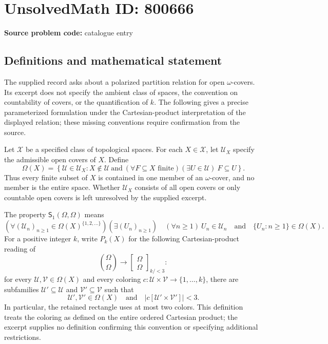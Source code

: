 \documentclass[11pt]{article}
\begin{document}
\section*{UnsolvedMath ID: 800666}
\textbf{Source problem code:} catalogue entry
\subsection{Definitions and mathematical statement}
The supplied record asks about a polarized partition relation for open \(\omega\)-covers. Its excerpt does not specify the ambient class of spaces, the convention on countability of covers, or the quantification of \(k\). The following gives a precise parameterized formulation under the Cartesian-product interpretation of the displayed relation; these missing conventions require confirmation from the source.

Let \(\mathscr X\) be a specified class of topological spaces. For each \(X\in\mathscr X\), let \(\mathscr U_X\) specify the admissible open covers of \(X\). Define
\[
\Omega(X)=\left\{\mathcal U\in\mathscr U_X:X\notin\mathcal U\ \text{and}\ (\forall F\subseteq X\text{ finite})(\exists U\in\mathcal U)\ F\subseteq U\right\}.
\]
Thus every finite subset of \(X\) is contained in one member of an \(\omega\)-cover, and no member is the entire space. Whether \(\mathscr U_X\) consists of all open covers or only countable open covers is left unresolved by the supplied excerpt.

The property \(\mathsf S_1(\Omega,\Omega)\) means
\[
(\forall (\mathcal U_n)_{n\geq1}\in\Omega(X)^{\{1,2,\ldots\}})
(\exists (U_n)_{n\geq1})\quad
(\forall n\geq1)\ U_n\in\mathcal U_n
\quad\text{and}\quad
\{U_n:n\geq1\}\in\Omega(X).
\]
For a positive integer \(k\), write \(P_k(X)\) for the following Cartesian-product reading of
\[
\binom{\Omega}{\Omega}\longrightarrow
\left[\begin{matrix}\Omega\\\Omega\end{matrix}\right]_{k/<3}:
\]
for every \(\mathcal U,\mathcal V\in\Omega(X)\) and every coloring
\(c:\mathcal U\times\mathcal V\to\{1,\ldots,k\}\), there are subfamilies
\(\mathcal U'\subseteq\mathcal U\) and \(\mathcal V'\subseteq\mathcal V\) such that
\[
\mathcal U',\mathcal V'\in\Omega(X)
\quad\text{and}\quad
\bigl|c[\mathcal U'\times\mathcal V']\bigr|<3.
\]
In particular, the retained rectangle uses at most two colors. This definition treats the coloring as defined on the entire ordered Cartesian product; the excerpt supplies no definition confirming this convention or specifying additional restrictions.
\end{document}
